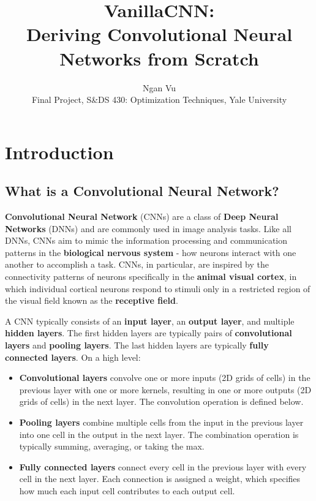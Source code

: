 \documentclass[12pt]{article}
\title{VanillaCNN:\\Deriving Convolutional Neural Networks from Scratch}
\author{Ngan Vu \\ Final Project, S\&DS 430: Optimization Techniques, Yale University}
\begin{document}
\maketitle

\section{Introduction}
\subsection{What is a Convolutional Neural Network?}
\textbf{Convolutional Neural Network} (CNNs) are a class of \textbf{Deep Neural Networks} (DNNs) and are commonly used in image analysis tasks. Like all DNNs, CNNs aim to mimic the information processing and communication patterns in the \textbf{biological nervous system} - how neurons interact with one another to accomplish a task. CNNs, in particular, are inspired by the connectivity patterns of neurons specifically in the \textbf{animal visual cortex}, in which individual cortical neurons respond to stimuli only in a restricted region of the visual field known as the \textbf{receptive field}.

A CNN typically consists of an \textbf{input layer}, an \textbf{output layer}, and multiple \textbf{hidden layers}. The first hidden layers are typically pairs of \textbf{convolutional layers} and \textbf{pooling layers}. The last hidden layers are typically \textbf{fully connected layers}. On a high level:
\begin{itemize}
    \item \textbf{Convolutional layers} convolve one or more inputs (2D grids of cells) in the previous layer with one or more kernels, resulting in one or more outputs (2D grids of cells) in the next layer. The convolution operation is defined below.
    \item \textbf{Pooling layers} combine multiple cells from the input in the previous layer into one cell in the output in the next layer. The combination operation is typically summing, averaging, or taking the max.
    \item \textbf{Fully connected layers} connect every cell in the previous layer with every cell in the next layer. Each connection is assigned a weight, which specifies how much each input cell contributes to each output cell.
\end{itemize}
\end{document}
